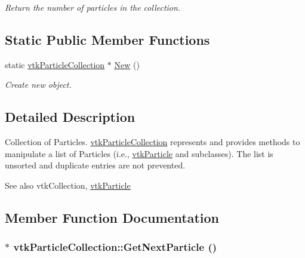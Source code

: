 \begin{DoxyCompactItemize}
\begin{DoxyCompactList}\small\item\em Return the number of particles in the collection. \item\end{DoxyCompactList}\end{DoxyCompactItemize}
\subsection*{Static Public Member Functions}
\begin{DoxyCompactItemize}
\item 
\hypertarget{classvtkParticleCollection_aecd9f1bccaf94788693e2472c1b42c79}{
static \hyperlink{classvtkParticleCollection}{vtkParticleCollection} $\ast$ \hyperlink{classvtkParticleCollection_aecd9f1bccaf94788693e2472c1b42c79}{New} ()}
\label{classvtkParticleCollection_aecd9f1bccaf94788693e2472c1b42c79}

\begin{DoxyCompactList}\small\item\em Create new object. \item\end{DoxyCompactList}\end{DoxyCompactItemize}


\subsection{Detailed Description}
Collection of Particles. \hyperlink{classvtkParticleCollection}{vtkParticleCollection} represents and provides methods to manipulate a list of Particles (i.e., \hyperlink{classvtkParticle}{vtkParticle} and subclasses). The list is unsorted and duplicate entries are not prevented. \begin{DoxySeeAlso}{See also}
vtkCollection, \hyperlink{classvtkParticle}{vtkParticle} 
\end{DoxySeeAlso}


\subsection{Member Function Documentation}
\hypertarget{classvtkParticleCollection_a9b9371fd750799c67b777509e80e82d3}{
\subsubsection[{GetNextParticle}]{ $\ast$ vtkParticleCollection::GetNextParticle ()}}
\label{classvtkParticleCollection_a9b9371fd750799c67b777509e80e82d3}



